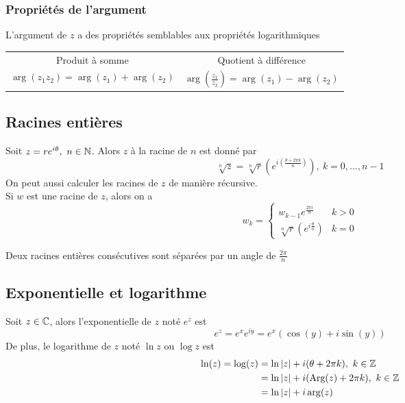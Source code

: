 \subsubsection{Propriétés de l'argument}
L'argument de $z$ a des propriétés semblables aux propriétés logarithmiques
\begin{center}
    \begin{tabular}{c@{\hskip 1in}c}
        Produit à somme                        & Quotient à différence                                       \\
        $\arg(z_1z_2) = \arg(z_1) + \arg(z_2)$ & $\arg\left( \frac{z_1}{z_2}\right) = \arg(z_1) - \arg(z_2)$
    \end{tabular}
\end{center}

\endgroup

\subsection{Racines entières}
\label{whole_roots}
Soit $z = re^{i\theta},\ n \in \mathbb{N}$. Alors $z$ à la racine de $n$ est donné par
\[
    \sqrt[n]{z} = \sqrt[n]{r} \left( e^{i \left( \frac{\theta + 2\pi k}{n} \right) } \right), \ k = 0, \dots, n - 1
\]
On peut aussi calculer les racines de $z$ de manière récursive. \\
Si $w$ est une racine de $z$, alors on a
\[
    w_k = \begin{cases}
        w_{k - 1}e^{ \frac{2\pi i}{n} }                    & k > 0 \\[0.5em]
        \sqrt[n]{r} \left( e^{i \frac{\theta}{n} } \right) & k = 0
    \end{cases}
\]
\begin{remark}
    Deux racines entières consécutives sont séparées par un angle de $\frac{2\pi}{n}$
\end{remark}

\subsection{Exponentielle  et logarithme}
Soit $z \in \mathbb{C}$, alors l'exponentielle de $z$ noté $e^z$ est
\[
    e^z = e^x e^{iy} = e^x (\cos(y) + i\sin(y))
\]
De plus, le logarithme de $z$ noté $\ln{z}$ ou $\log{z}$ est
\begin{align*}
    \ln(z) = \log(z) & = \ln|z| + i(\theta + 2\pi k), \ k \in \mathbb{Z}        \\
                     & = \ln|z| + i(\text{Arg}(z) + 2\pi k), \ k \in \mathbb{Z} \\
                     & = \ln|z| + i\arg(z)                              \\
\end{align*}

